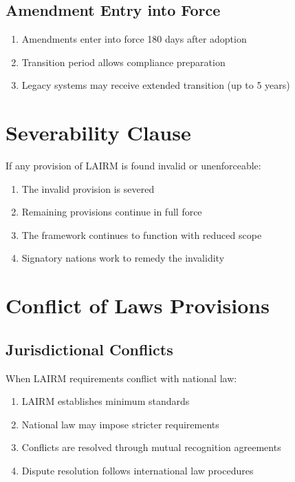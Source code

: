 \documentclass[12pt,a4paper,twoside,openright]{book}
\begin{document}
\subsection{Amendment Entry into Force}

\begin{enumerate}
    \item Amendments enter into force 180 days after adoption
    \item Transition period allows compliance preparation
    \item Legacy systems may receive extended transition (up to 5 years)
\end{enumerate}

\section{Severability Clause}

If any provision of LAIRM is found invalid or unenforceable:

\begin{enumerate}
    \item The invalid provision is severed
    \item Remaining provisions continue in full force
    \item The framework continues to function with reduced scope
    \item Signatory nations work to remedy the invalidity
\end{enumerate}

\section{Conflict of Laws Provisions}

\subsection{Jurisdictional Conflicts}

When LAIRM requirements conflict with national law:

\begin{enumerate}
    \item LAIRM establishes minimum standards
    \item National law may impose stricter requirements
    \item Conflicts are resolved through mutual recognition agreements
    \item Dispute resolution follows international law procedures
\end{enumerate}
\end{document}
